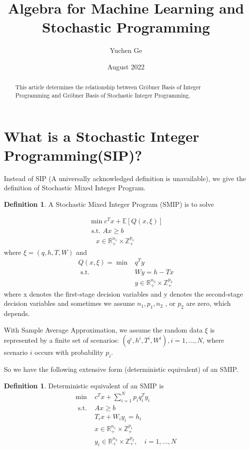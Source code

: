\documentclass{article}
\title{Algebra for Machine Learning and Stochastic Programming}
\author{Yuchen Ge}
\date{August 2022}
\theoremstyle{plain}
\theoremstyle{definition}
\newtheorem{definition}[theorem]{Definition}
\begin{document}
\maketitle
\tableofcontents
\newpage

\begin{abstract}
This article determines the relationship between Gröbner Basis of Integer Programming and Gröbner Basis of Stochastic Integer Programming. 
\end{abstract}

\section{What is a Stochastic Integer Programming(SIP)?}
Instead of SIP (A universally acknowledged definition is unavailable), we give the definition of  Stochastic Mixed Integer Program. 

\begin{definition}
\label{SMIP}
A Stochastic Mixed Integer Program (SMIP) is to solve 

\begin{equation}
\begin{array}{l}
\min c^{T} x+\mathbb{E}[Q(x, \xi)] \\
\text { s.t. } A x \geq b \\
\quad x \in \mathbb{R}_{+}^{n_{1}} \times \mathbb{Z}_{+}^{p_{1}}
\end{array}
\end{equation}
where  $\xi=(q, h, T, W)$  and
$$
\begin{aligned}
Q(x, \xi)=\min &  q^{T} y \\
\text { s.t. } & W y=h-T x \\
& y \in \mathbb{R}_{+}^{n_{2}} \times \mathbb{Z}_{+}^{p_{2}} 
\end{aligned}
$$
where x denotes the first-stage decision variables and  y  denotes the second-stage decision variables and sometimes we assume  $n_{1}, p_{1}, n_{2}$ , or  $p_{2}$  are zero, which depends.
\end{definition}

With Sample Average Approximation, we assume the random data  $\xi$  is represented by a finite set of scenarios: $\left(q^{i}, h^{i}, T^{i}, W^{i}\right), i=1, \ldots, N$, where scenario  $i$  occurs with probability  $p_{i}$.

So we have the following extensive form (deterministic equivalent) of an SMIP. 

\begin{definition} 
Deterministic equivalent of an SMIP is 
\begin{equation}
\begin{array}{ll}
\min & c^{T} x+\sum_{i=1}^{N} p_{i} q_{i}^{T} y_{i} \\
\text { s.t. } & A x \geq b \\
& T_{i} x+W_{i} y_{i}=h_{i} \\
& x \in \mathbb{R}_{+}^{n_{1}} \times \mathbb{Z}_{+}^{p_{1}} \\
& y_{i} \in \mathbb{R}_{+}^{n_{2}} \times \mathbb{Z}_{+}^{p_{2}}, \quad i=1, \ldots, N
\end{array}
\end{equation}
\end{definition}
\end{document}
